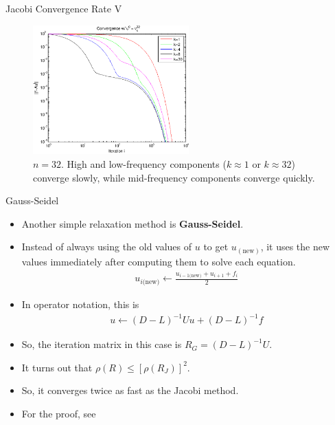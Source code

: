 \documentclass{beamer}
\begin{document}
\begin{frame}{Jacobi Convergence Rate V}
 \begin{figure}
  \includegraphics[width=6cm]{images/jacobiConvergence_freq.pdf}
  \caption{$n=32$. High and low-frequency components ($k \approx 1$ or
           $k \approx 32$) converge slowly, while mid-frequency components
           converge quickly.}
 \end{figure}
\end{frame}

\begin{frame}[label=gaussSeidel]{Gauss-Seidel}
 \begin{itemize}
  \item Another simple relaxation method is \textbf{Gauss-Seidel}.
  \item Instead of always using the old values of $u$ to get $u_{(\text{new})}$,
        it uses the new values immediately after computing them to solve each
        equation.
  \begin{align}
   u_{i\text{(new)}} \leftarrow \frac{u_{i-1\text{(new)}}+u_{i+1}+f_i}{2}
  \end{align}
  \item In operator notation, this is
  \begin{align}
   u \leftarrow (D-L)^{-1}Uu + (D-L)^{-1}f
  \end{align}
  \item So, the iteration matrix in this case is $R_G=(D-L)^{-1}U$.
  \item It turns out that $\rho(R) \leq \left[\rho(R_J)\right]^{2}$.
  \item So, it converges twice as fast as the Jacobi method.
  \item For the proof, see
        \hyperlink{gaussSeidelProof}{}
 \end{itemize}
\end{frame}
\end{document}
